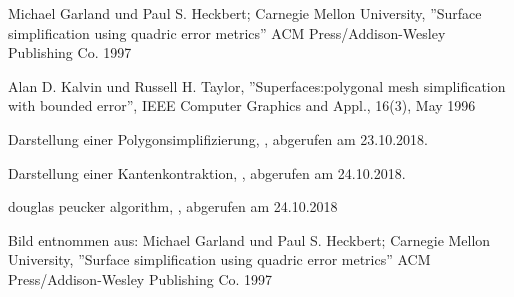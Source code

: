 \documentclass[runningheads]{llncs}
\begin{document}
\begin{thebibliography}{5}

Michael Garland und Paul S. Heckbert; Carnegie Mellon University, ''Surface simplification using quadric error metrics'' 
ACM Press/Addison-Wesley Publishing Co. 1997

Alan D. Kalvin und Russell H. Taylor, ''Superfaces:polygonal
mesh simplification with bounded error'', IEEE Computer
Graphics and Appl., 16(3), May 1996

Darstellung einer Polygonsimplifizierung, \urlPoligonSimplification, abgerufen am 23.10.2018.

Darstellung einer Kantenkontraktion, \urlEdgeContraction, abgerufen am 24.10.2018.

douglas peucker algorithm, \urlDouglasPeckerAlg, abgerufen am 24.10.2018

Bild entnommen aus: Michael Garland und Paul S. Heckbert; Carnegie Mellon University, ''Surface simplification using quadric error metrics'' 
ACM Press/Addison-Wesley Publishing Co. 1997
\end{thebibliography}
\end{document}
